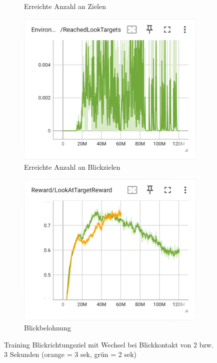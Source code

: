 \begin{figure}[H]
\begin{subfigure}{.49\textwidth}
      \caption{Erreichte Anzahl an Zielen}
      \label{fig:117_119_reach_target}
    \end{subfigure}
    \begin{subfigure}{.49\textwidth}
      \centering  
      \includegraphics[width=\textwidth]{img/117_119_reach_look_target}
      \caption{Erreichte Anzahl an Blickzielen}
      \label{fig:117_119_reach_look_target}
    \end{subfigure}
    \begin{subfigure}{.49\textwidth}
      \centering  
      \includegraphics[width=\textwidth]{img/117_119_look_reward}
      \caption{Blickbelohnung}
      \label{fig:117_119_look_reward}
    \end{subfigure}
  \caption{Training Blickrichtungsziel mit Wechsel bei Blickkontakt von 2 bzw. 3 Sekunden (orange = 3 sek, grün = 2 sek)}
  \label{fig:training_blickrichtungsziel_wechsel_spherecast}
\end{figure}
